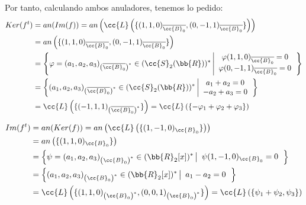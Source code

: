 \documentclass[12pt]{article}
\begin{document}
\begin{ejercicio}
    Por tanto, calculando ambos anuladores, tenemos lo pedido:
    \begin{equation*}\begin{split}
        Ker(f^t)&= an(Im(f)) = an\left(\cc{L}\left(\{(1, 1, 0)_{\overline{\cc{B}_0}}, (0, -1, 1)_{\overline{\cc{B}_0}}\}\right)\right) \\
        &= an\left(\{(1, 1, 0)_{\overline{\cc{B}_0}}, (0, -1, 1)_{\overline{\cc{B}_0}}\}\right) \\
        &= \left\{\varphi = (a_1, a_2, a_3)_{\left(\overline{\cc{B}_0}\right)^\ast} \in (\cc{S}_2(\bb{R}))^\ast \left|\begin{array}{c}
            \varphi (1, 1, 0)_{\overline{\cc{B}_0}} = 0 \\
            \varphi (0, -1, 1)_{\overline{\cc{B}_0}} = 0
        \end{array}\right.\right\} \\
        &= \left\{(a_1, a_2, a_3)_{\left(\overline{\cc{B}_0}\right)^\ast} \in (\cc{S}_2(\bb{R}))^\ast \left|\begin{array}{c}
            a_1+a_2=0 \\ -a_2+a_3=0
        \end{array}\right.\right\} \\
        &= \cc{L}\left(\{(-1, 1, 1)_{\left(\overline{\cc{B}_0}\right)^\ast}\}\right)
        = \cc{L}\left(\{-\varphi_1+\varphi_2+\varphi_3\}\right)
    \end{split}\end{equation*}

    \begin{equation*}\begin{split}
        Im(f^t)&= an(Ker(f)) = an\left(\cc{L}\left(\{(1, -1, 0)_{\cc{B}_0}\}\right)\right) \\
        &= an\left(\{(1, 1, 0)_{\cc{B}_0}\}\right) \\
        &= \left\{\psi = (a_1, a_2, a_3)_{\left({\cc{B}_0}\right)^\ast} \in (\bb{R}_2[x])^\ast \left|\begin{array}{c}
            \psi (1, -1, 0)_{{\cc{B}_0}} = 0 \\
        \end{array}\right.\right\} \\
        &= \left\{(a_1, a_2, a_3)_{\left({\cc{B}_0}\right)^\ast} \in (\bb{R}_2[x])^\ast \left|\begin{array}{c}
            a_1-a_2=0
        \end{array}\right.\right\} \\
        &= \cc{L}\left(\{(1, 1, 0)_{\left({\cc{B}_0}\right)^\ast}, (0, 0, 1)_{\left({\cc{B}_0}\right)^\ast}\}\right)
        = \cc{L}\left(\{\psi_1+\psi_2, \psi_3\}\right)
    \end{split}\end{equation*}
\end{ejercicio}
\end{document}
